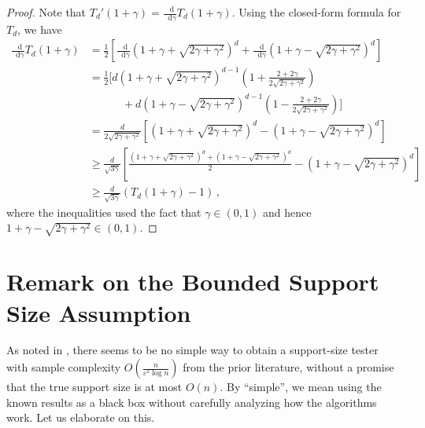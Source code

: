 \documentclass[10pt,a4paper]{article}
\newcommand{\odif}{\mathop{}\!\mathrm{d}} %
\renewcommand{\epsilon}{\varepsilon}
\begin{document}
\restdprimelb*
\begin{proof}
    Note that $T_d'(1+\gamma) = \frac{\odif}{\odif \gamma} T_d(1+\gamma)$. Using the closed-form
    formula for $T_d$, we have
    \begin{align*}
        \frac{\odif}{\odif \gamma} T_d(1+\gamma)
        &= \frac{1}{2} \left[
            \frac{\odif}{\odif \gamma} \left(1+\gamma + \sqrt{2\gamma+\gamma^2}\right)^d
            + \frac{\odif}{\odif \gamma} \left(1+\gamma - \sqrt{2\gamma+\gamma^2}\right)^d
        \right] \\
        &= \frac{1}{2} \Bigg[
            d \left(1+\gamma + \sqrt{2\gamma+\gamma^2}\right)^{d-1} \left(
                1 + \frac{2+2\gamma}{2\sqrt{2\gamma+\gamma^2}}
            \right) \\
        &\qquad \quad
            + d \left(1+\gamma - \sqrt{2\gamma+\gamma^2}\right)^{d-1} \left(
                1 - \frac{2+2\gamma}{2\sqrt{2\gamma+\gamma^2}}
            \right)
        \Bigg] \\
        &= \frac{d}{2\sqrt{2\gamma+\gamma^2}} \left[
            \left(1+\gamma + \sqrt{2\gamma+\gamma^2}\right)^d
            - \left(1+\gamma - \sqrt{2\gamma+\gamma^2}\right)^d
        \right] \\
        &\ge \frac{d}{\sqrt{3\gamma}} \left[
            \frac{\left(1+\gamma + \sqrt{2\gamma+\gamma^2}\right)^d
                + \left(1+\gamma - \sqrt{2\gamma+\gamma^2}\right)^d}{2}
            - \left(1+\gamma - \sqrt{2\gamma+\gamma^2}\right)^d
        \right] \\
        &\ge \frac{d}{\sqrt{3\gamma}} \left( T_d(1+\gamma) - 1 \right) \,,
    \end{align*}
    where the inequalities used the fact that $\gamma \in (0,1)$ and hence $1 + \gamma -
    \sqrt{2\gamma+\gamma^2} \in (0, 1)$.
\end{proof}

\section{Remark on the Bounded Support Size Assumption}
\label{section:support-assumption}
\label{section:instance-optimal}

As noted in \cite[pp.~21]{GR23}, there seems to be no simple way to obtain a support-size tester
with sample complexity $O\left(\frac{n}{\epsilon^2 \log n}\right)$ from the prior literature,
without a promise that the true support size is at most $O(n)$. By ``simple''\!, we mean using the
known results as a black box without carefully analyzing how the algorithms work. Let us elaborate
on this.
\end{document}
